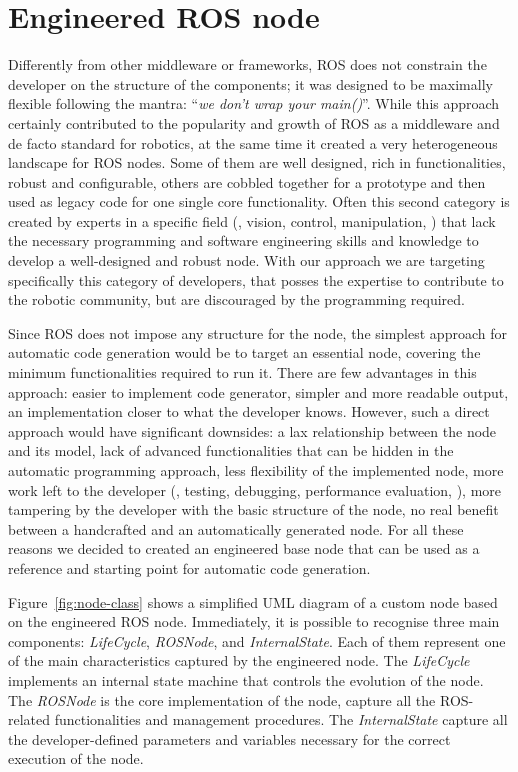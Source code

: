 \section{Engineered ROS node}
\label{sec:ros-node}
Differently from other middleware or frameworks, ROS does not constrain the developer on the structure of the components; it was designed to be maximally flexible following the mantra: ``\textit{we don't wrap your main()}''. While this approach certainly contributed to the popularity and growth of ROS as a middleware and de facto standard for robotics, at the same time it created a very heterogeneous landscape for ROS nodes. Some of them are well designed, rich in functionalities, robust and configurable, others are cobbled together for a prototype and then used as legacy code for one single core functionality. Often this second category is created by experts in a specific field (\eg, vision, control, manipulation, \etc) that lack the necessary programming and software engineering skills and knowledge to develop a well-designed and robust node. With our approach we are targeting specifically this category of developers, that posses the expertise to contribute to the robotic community, but are discouraged by the programming required.

Since ROS does not impose any structure for the node, the simplest approach for automatic code generation would be to target an essential node, covering the minimum functionalities required to run it. There are few advantages in this approach: easier to implement code generator, simpler and more readable output, an implementation closer to what the developer knows. However, such a direct approach would have significant downsides: a lax relationship between the node and its model, lack of advanced functionalities that can be hidden in the automatic programming approach, less flexibility of the implemented node, more work left to the developer (\eg, testing, debugging, performance evaluation, \etc), more tampering by the developer with the basic structure of the node, no real benefit between a handcrafted and an automatically generated node. For all these reasons we decided to created an engineered base node that can be used as a reference and starting point for automatic code generation.

Figure~\ref{fig:node-class} shows a simplified UML diagram of a custom node based on the engineered ROS node. Immediately, it is possible to recognise three main components: \textit{LifeCycle}, \textit{ROSNode}, and \textit{InternalState}. Each of them represent one of the main characteristics captured by the engineered node. The \textit{LifeCycle} implements an internal state machine that controls the evolution of the node. The \textit{ROSNode} is the core implementation of the node, capture all the ROS-related functionalities and management procedures. The \textit{InternalState} capture all the developer-defined parameters and variables necessary for the correct execution of the node.

